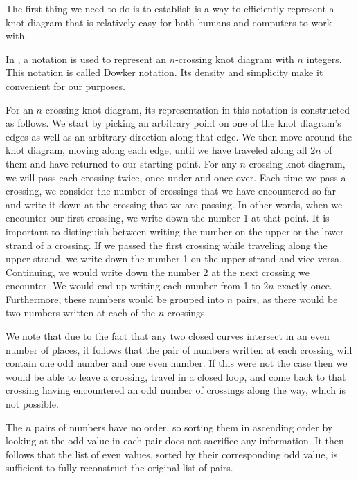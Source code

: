 \begin{paper}

The first thing we need to do is to establish is a way to efficiently represent
a knot diagram that is relatively easy for both humans and computers to work
with.

In \cite{htw}, a notation is used to represent an $n$-crossing knot diagram with
$n$ integers.
This notation is called Dowker notation.
Its density and simplicity make it convenient for our purposes.

For an $n$-crossing knot diagram, its representation in this notation is
constructed as follows.
We start by picking an arbitrary point on one of the knot diagram's edges as
well as an arbitrary direction along that edge.
We then move around the knot diagram, moving along each edge, until we have
traveled along all $2n$ of them and have returned to our starting point.
For any $n$-crossing knot diagram, we will pass each crossing twice, once under
and once over.
Each time we pass a crossing, we consider the number of crossings that we
have encountered so far and write it down at the crossing that we are passing.
In other words, when we encounter our first crossing, we write down the number 1
at that point.
It is important to distinguish between writing the number on the upper or the
lower strand of a crossing.
If we passed the first crossing while traveling along the upper strand, we write
down the number 1 on the upper strand and vice versa.
Continuing, we would write down the number 2 at the next crossing we encounter.
We would end up writing each number from 1 to $2n$ exactly once.
Furthermore, these numbers would be grouped into $n$ pairs, as there would be
two numbers written at each of the $n$ crossings.

We note that due to the fact that any two closed curves intersect in an even
number of places, it follows that the pair of numbers written at each crossing
will contain one odd number and one even number.
If this were not the case then we would be able to leave a crossing, travel in a
closed loop, and come back to that crossing having encountered an odd number of
crossings along the way, which is not possible.

The $n$ pairs of numbers have no order, so sorting them in ascending order by
looking at the odd value in each pair does not sacrifice any information.
It then follows that the list of even values, sorted by their corresponding odd
value, is sufficient to fully reconstruct the original list of pairs.\\


\end{paper}
